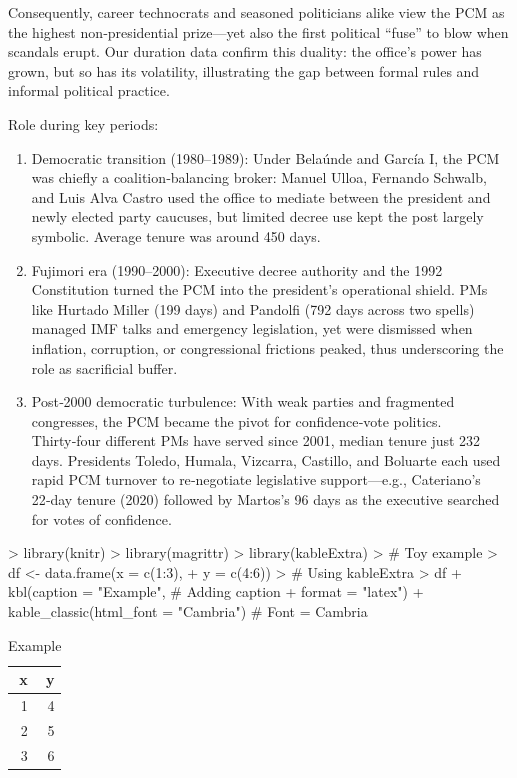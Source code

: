 \documentclass[a4paper, 12pt]{article}
\begin{document}
Consequently, career technocrats and seasoned politicians alike view the PCM as the highest non‑presidential prize—yet also the first political “fuse” to blow when scandals erupt. Our duration data confirm this duality: the office’s power has grown, but so has its volatility, illustrating the gap between formal rules and informal political practice.

Role during key periods:

\begin{enumerate}
    \item Democratic transition (1980–1989): Under Belaúnde and García I, the PCM was chiefly a coalition‑balancing broker: Manuel Ulloa, Fernando Schwalb, and Luis Alva Castro used the office to mediate between the president and newly elected party caucuses, but limited decree use kept the post largely symbolic. Average tenure was around 450 days.
    \item Fujimori era (1990–2000): Executive decree authority and the 1992 Constitution turned the PCM into the president’s operational shield. PMs like Hurtado Miller (199 days) and Pandolfi (792 days across two spells) managed IMF talks and emergency legislation, yet were dismissed when inflation, corruption, or congressional frictions peaked, thus underscoring the role as sacrificial buffer.
    \item Post‑2000 democratic turbulence: With weak parties and fragmented congresses, the PCM became the pivot for confidence‑vote politics. Thirty‑four different PMs have served since 2001, median tenure just 232 days. Presidents Toledo, Humala, Vizcarra, Castillo, and Boluarte each used rapid PCM turnover to re‑negotiate legislative support—e.g., Cateriano’s 22‑day tenure (2020) followed by Martos’s 96 days as the executive searched for votes of confidence.
\end{enumerate}


\begin{Schunk}
\begin{Sinput}
> library(knitr)
> library(magrittr)
> library(kableExtra)
> # Toy example 
> df <- data.frame(x = c(1:3), 
+              y = c(4:6))
> # Using kableExtra 
> df %
+     kbl(caption = "Example", # Adding caption  
+         format = "latex") %
+     kable_classic(html_font = "Cambria") # Font = Cambria 
\end{Sinput}
\begin{table}
\centering
\caption{Example}
\centering
\begin{tabular}[t]{r|r}
\hline
x & y\\
\hline
1 & 4\\
\hline
2 & 5\\
\hline
3 & 6\\
\hline
\end{tabular}
\end{table}\end{Schunk}
\end{document}
